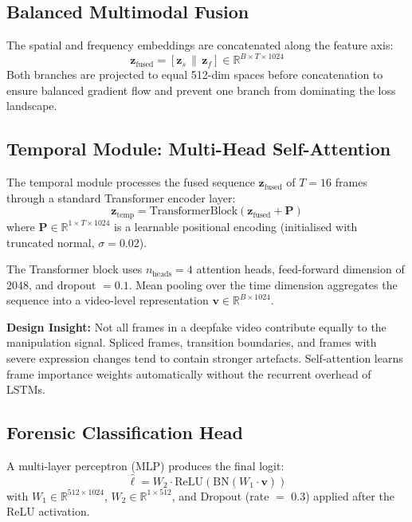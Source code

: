 \documentclass[journal]{IEEEtran}
\begin{document}
\subsection{Balanced Multimodal Fusion}
The spatial and frequency embeddings are concatenated along the feature axis:
\begin{equation}
\mathbf{z}_\text{fused} = [\mathbf{z}_s \, \| \, \mathbf{z}_f] \in \mathbb{R}^{B \times T \times 1024}
\end{equation}
Both branches are projected to equal 512-dim spaces before concatenation to ensure balanced gradient flow and prevent one branch from dominating the loss landscape.

\subsection{Temporal Module: Multi-Head Self-Attention}
The temporal module processes the fused sequence $\mathbf{z}_\text{fused}$ of $T=16$ frames through a standard Transformer encoder layer:
\begin{equation}
\mathbf{z}_\text{temp} = \text{TransformerBlock}(\mathbf{z}_\text{fused} + \mathbf{P})
\end{equation}
where $\mathbf{P} \in \mathbb{R}^{1 \times T \times 1024}$ is a learnable positional encoding (initialised with truncated normal, $\sigma=0.02$).

The Transformer block uses $n_\text{heads} = 4$ attention heads, feed-forward dimension of $2048$, and dropout $= 0.1$. Mean pooling over the time dimension aggregates the sequence into a video-level representation $\mathbf{v} \in \mathbb{R}^{B \times 1024}$.

\textbf{Design Insight:} Not all frames in a deepfake video contribute equally to the manipulation signal. Spliced frames, transition boundaries, and frames with severe expression changes tend to contain stronger artefacts. Self-attention learns frame importance weights automatically without the recurrent overhead of LSTMs.

\subsection{Forensic Classification Head}
A multi-layer perceptron (MLP) produces the final logit:
\begin{equation}
\hat{\ell} = W_2 \cdot \text{ReLU}(\text{BN}(W_1 \cdot \mathbf{v}))
\end{equation}
with $W_1 \in \mathbb{R}^{512 \times 1024}$, $W_2 \in \mathbb{R}^{1 \times 512}$, and Dropout (rate $=$ 0.3) applied after the ReLU activation.
\end{document}
